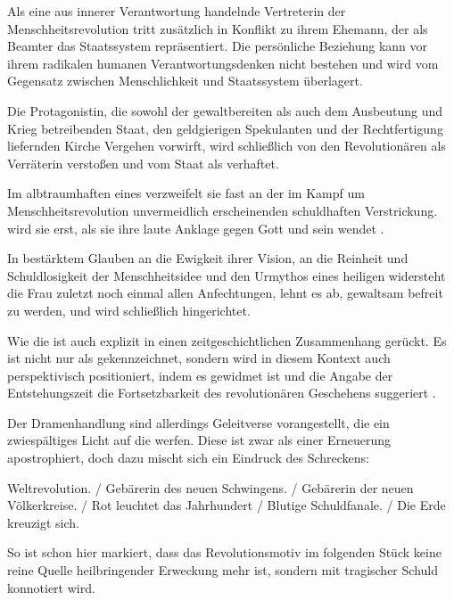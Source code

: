 Als eine aus innerer Verantwortung handelnde Vertreterin der
Menschheitsrevolution tritt \Cite{die Frau} zusätzlich in Konflikt zu ihrem
Ehemann, der als Beamter das Staatssystem repräsentiert. Die persönliche
Beziehung kann vor ihrem radikalen humanen Verantwortungsdenken nicht bestehen
und wird vom Gegensatz zwischen Menschlichkeit und Staatssystem überlagert.

Die Protagonistin, die sowohl der gewaltbereiten \Cite{Masse} als auch dem
Ausbeutung und Krieg betreibenden Staat, den geldgierigen Spekulanten und der
Rechtfertigung liefernden Kirche Vergehen \Cite{am Menschen} vorwirft, wird
schließlich von den Revolutionären als Verräterin verstoßen und vom Staat als
\Cite{Führerin}  verhaftet.

Im albtraumhaften \Cite{Käfig} eines \Cite{Menschenschauhauses}
 verzweifelt
sie fast an der im Kampf um Menschheitsrevolution unvermeidlich erscheinenden
schuldhaften Verstrickung. \Cite{Geheilt} wird sie erst, als sie ihre laute
Anklage gegen Gott und sein \Cite{ungeheuerlich Gesetz der Schuld} wendet
.

In bestärktem Glauben an die Ewigkeit ihrer Vision, an die Reinheit und
Schuldlosigkeit der Menschheitsidee und den Urmythos eines heiligen
\Cite{Werk-Volkes}  widersteht die Frau zuletzt noch
einmal allen Anfechtungen, lehnt es ab, gewaltsam befreit zu werden, und wird
schließlich hingerichtet.


Wie die  ist auch  explizit in
einen zeitgeschichtlichen Zusammenhang gerückt. Es ist nicht nur als
\Cite{Stück aus der sozialen Revolution des 20. Jahrhunderts} gekennzeichnet,
sondern wird in diesem Kontext auch perspektivisch positioniert, indem es
\Cite{den Proletariern} gewidmet ist und die Angabe der Entstehungszeit
\Cite{im ersten Jahr der deutschen Revolution} die Fortsetzbarkeit des
revolutionären Geschehens suggeriert . 

Der Dramenhandlung sind allerdings Geleitverse vorangestellt, die ein
zwiespältiges Licht auf die \Cite{Weltrevolution} werfen. Diese ist
zwar als \Cite{Gebärerin} einer Erneuerung apostrophiert, doch dazu
mischt sich ein Eindruck des Schreckens: 

\begin{BlockQuote}
Weltrevolution. / Gebärerin des neuen Schwingens. / Gebärerin der neuen
Völkerkreise. / Rot leuchtet das Jahrhundert / Blutige Schuldfanale. / Die
Erde kreuzigt sich.
\end{BlockQuote}
So ist schon hier markiert, dass das Revolutionsmotiv im folgenden Stück
keine reine Quelle heilbringender Erweckung mehr ist, sondern mit tragischer
Schuld konnotiert wird.

